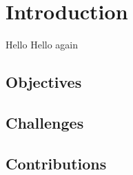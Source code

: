 \chapter{Introduction}
Hello \cite{willis-design-2022}
Hello again \cite{baqais-lit-review-2019}
\section{Objectives}
\section{Challenges}
\section{Contributions}